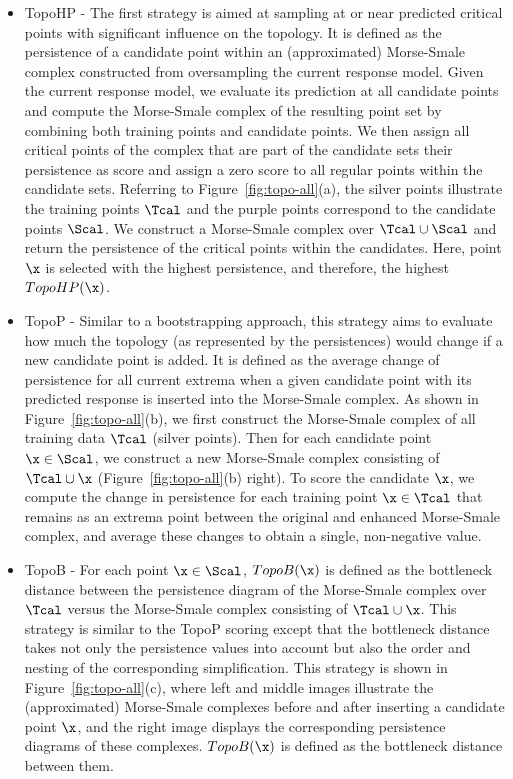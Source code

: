 \begin{itemize}
\item{TopoHP - The first strategy is aimed at sampling at or near predicted critical points with significant influence on the topology.
%
It is defined as the persistence of a candidate point within an (approximated) Morse-Smale complex constructed from oversampling the current response model.
%
Given the current response model, we evaluate its prediction at all candidate points and compute the Morse-Smale complex of the resulting point set by combining both training points and candidate points.
%
We then assign all critical points of the complex that are part of the candidate sets their persistence as score and assign a zero score to all regular points within the candidate sets.
%
Referring to Figure~\ref{fig:topo-all}(a), the silver points illustrate the training points $\Tcal$ and the purple points correspond to the candidate points $\Scal$.
%
We construct a Morse-Smale complex over $\Tcal \cup \Scal$ and return the persistence of the critical points within the candidates.
%
Here, point $\x$ is selected with the highest persistence, and therefore, the highest $TopoHP(\x)$.}

\item{TopoP - Similar to a bootstrapping approach, this strategy aims to evaluate how much the topology (as represented by the persistences) would change if a new candidate point is added.
%
It is defined as the average change of persistence for all current extrema when a given candidate point with its predicted response is inserted into the Morse-Smale complex.
%
As shown in Figure~\ref{fig:topo-all}(b), we first construct the Morse-Smale complex of all training data $\Tcal$ (silver points).
%
Then for each candidate point $\x \in \Scal$, we construct a new Morse-Smale complex consisting of $\Tcal \cup \x$ (Figure~\ref{fig:topo-all}(b) right).
%
To score the candidate $\x$, we compute the change in persistence for each training point $\x \in \Tcal$ that remains as an extrema point between the original and enhanced Morse-Smale complex, and average these changes to obtain a single, non-negative value.}

\item{TopoB - For each point $\x \in \Scal$, $TopoB(\x)$ is defined as the bottleneck distance between the persistence diagram of the Morse-Smale complex over $\Tcal$ versus the Morse-Smale complex consisting of $\Tcal \cup \x$.
%
This strategy is similar to the TopoP scoring except that the bottleneck distance takes not only the persistence values into account but also the order and nesting of the corresponding simplification.
%
This strategy is shown in Figure~\ref{fig:topo-all}(c), where left and middle images illustrate the (approximated) Morse-Smale complexes before and after inserting a candidate point $\x$, and the right image displays the corresponding persistence diagrams of these complexes.
%
$TopoB(\x)$ is defined as the bottleneck distance between them.}
\end{itemize}

